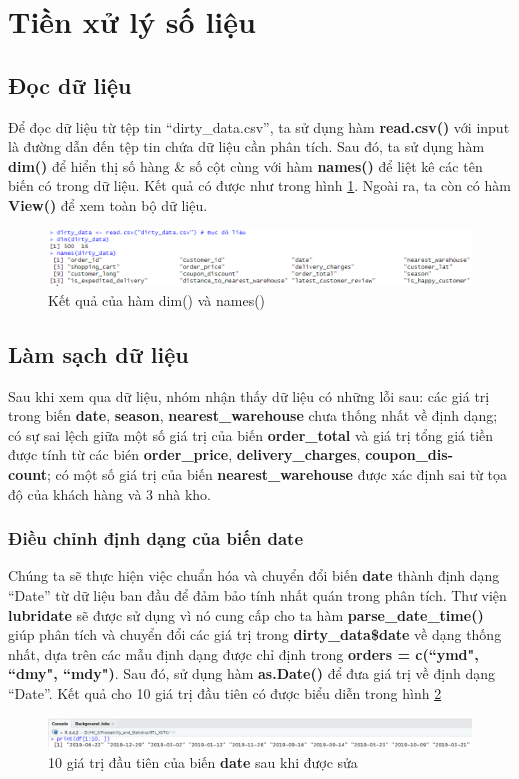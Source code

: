 \section{Tiền xử lý số liệu}
\subsection{Đọc dữ liệu}
Để đọc dữ liệu từ tệp tin ``dirty\_data.csv'', ta sử dụng hàm \textbf{read.csv()} với input là đường dẫn đến tệp tin chứa dữ liệu cần phân tích. Sau đó, ta sử dụng hàm \textbf{dim()} để hiển thị số hàng \& số cột cùng với hàm \textbf{names()} để liệt kê các tên biến có trong dữ liệu. Kết quả có được như trong hình \ref{f1}. Ngoài ra, ta còn có hàm \textbf{View()} để xem toàn bộ dữ liệu.
\begin{figure}[!htbp]
    \centering
    \includegraphics[width=\textwidth]{graphics/Pre_processing_data/f1.PNG}
    \caption{Kết quả của hàm dim() và names()}
    \label{f1}
\end{figure}

\subsection{Làm sạch dữ liệu}
Sau khi xem qua dữ liệu, nhóm nhận thấy dữ liệu có những lỗi sau: các giá trị trong biến \textbf{date}, \textbf{season}, \textbf{nearest\_warehouse} chưa thống nhất về định dạng; có sự sai lệch giữa một số giá trị của biến \textbf{order\_total} và giá trị tổng giá tiền được tính từ các bién \textbf{order\_price}, \textbf{delivery\_charges}, \textbf{coupon\_dis-\\
count}; có một số giá trị của biến \textbf{nearest\_warehouse} được xác định sai từ tọa độ của khách hàng và 3 nhà kho.

\subsubsection{Điều chỉnh định dạng của biến date}
Chúng ta sẽ thực hiện việc chuẩn hóa và chuyển đổi biến \textbf{date} thành định dạng ``Date'' từ dữ liệu ban đầu để đảm bảo tính nhất quán trong phân tích. Thư viện \textbf{lubridate} sẽ được sử dụng vì nó cung cấp cho ta hàm \textbf{parse\_date\_time()} giúp phân tích và chuyển đổi các giá trị trong \textbf{dirty\_data\$date} về dạng thống nhất, dựa trên các mẫu định dạng được chỉ định trong \textbf{orders = c(``ymd", ``dmy", ``mdy")}. Sau đó, sử dụng hàm \textbf{as.Date()} để đưa giá trị về định dạng ``Date''. Kết quả cho 10 giá trị đầu tiên có được biểu diễn trong hình \ref{f2}
\begin{figure}[!htbp]
    \centering
    \includegraphics[width=\textwidth]{graphics/Pre_processing_data/f2.PNG}
    \caption{10 giá trị đầu tiên của biến \textbf{date} sau khi được sửa}
    \label{f2}
\end{figure} 

